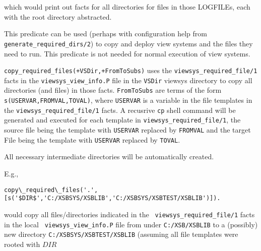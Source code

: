 \begin{description}
\noindent which would print out facts for all directories for files in
those LOGFILEs, each with the root directory abstracted.

%
This predicate can be used (perhaps with configuration help from {\tt
  generate\_required\_dirs/2}) to copy and deploy view systems and the
files they need to run.  This predicate is not needed for normal
execution of view systems.

{\tt copy\_required\_files(+VSDir,+FromToSubs)} uses the
{\tt viewsys\_required\_file/1} facts in the {\tt viewsys\_view\_info.P}
file in the {\tt VSDir} viewsys directory to copy all directories (and
files) in those facts.  {\tt FromToSubs} are terms of the form
{\tt s(USERVAR,FROMVAL,TOVAL)}, where {\tt USERVAR} is a variable in the
file templates in the {\tt viewsys\_required\_file/1} facts.  A
recusrive {\tt cp} shell command will be generated and executed for
each template in {\tt viewsys\_required\_file/1}, the source file being
the template with {\tt USERVAR} replaced by {\tt FROMVAL} and the target
File being the template with {\tt USERVAR} replaced by {\tt TOVAL}.

All necessary intermediate directories will be automatically created.

E.g.,
\begin{verbatim}
copy\_required\_files('.',[s('$DIR$','C:/XSBSYS/XSBLIB','C:/XSBSYS/XSBTEST/XSBLIB')]).
\end{verbatim}

\noindent would copy all files/directories indicated in the {\tt
  viewsys\_required\_file/1} facts in the local {\tt
  viewsys\_view\_info.P} file from under {\tt C:/XSB/XSBLIB} to a
(possibly) new directory {\tt C:/XSBSYS/XSBTEST/XSBLIB} (assuming all
file templates were rooted with {\tt $DIR$}


\end{description}
